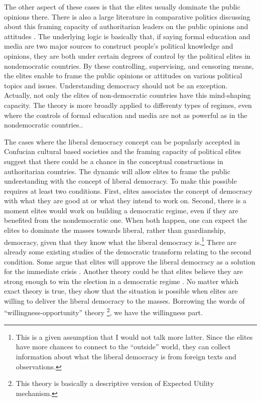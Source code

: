 \documentclass[abstracton,UTF8]{ctexart}
\begin{document}
The other aspect of these cases is that the elites usually dominate the public opinions there. There is also a large literature in comparative politics discussing about this framing capacity of authoritarian leaders on the public opinions and attitudes \citep{Miller1979,Jiang2015,Zheng2004,Stein2012,Shirk2010}. The underlying logic is basically that, if saying formal education and media are two major sources to construct people's political knowledge and opinions, they are both under certain degrees of control by the political elites in nondemocratic countries. By these controlling, supervising, and censoring means, the elites enable to frame the public opinions or attitudes on various political topics and issues. Understanding democracy should not be an exception. Actually, not only the elites of non-democratic countries have this mind-shaping capacity. The theory is more broadly applied to differenty types of regimes, even where the controls of formal education and media are not as powerful as in the nondemocratic countries.\citep{Patterson1999,Chan1997,Sniderman2004,Chong2007,Zaller1994,Zaller1990}. 

The cases where the liberal democracy concept can be popularly accepted in Confucian cultural based societies and the framing capacity of political elites suggest that there could be a chance in the conceptual constructions in authoritarian countries. The dynamic will allow elites to frame the public understanding with the concept of liberal democracy. To make this possible requires at least two conditions. First, elites associates the concept of democracy with what they are good at or what they intend to work on. Second, there is a moment elites would work on building a democratic regime, even if they are benefited from the nondemocratic one. When both happen, one can expect the elites to dominate the masses towards liberal, rather than guardianship, democracy, given that they know what the liberal democracy is.\footnote{This is a given assumption that I would not talk more latter. Since the elites have more chances to connect to the ``outside'' world, they can collect information about what the liberal democracy is from foreign texts and observations.} There are already some existing studies of the democratic transform relating to the second condition. Some argue that elites will approve the liberal democracy as a solution for the immediate crisis \citep{Przeworski2000,ODonnell2013,Salame1994}. Another theory could be that elites believe they are strong enough to win the election in a democratic regime \citep{Magaloni2006}. No matter which exact theory is true, they show that the situation is possible when elites are willing to deliver the liberal democracy to the masses. Borrowing the words of ``willingness-opportunity'' theory \citep{Cioffi-Revilla1995,Starr1978}\footnote{This theory is basically a descriptive version of Expected Utility mechanism.}, we have the willingness part. 
\end{document}
